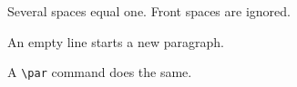 \documentclass{ctexart}
\begin{document}
Several spaces          equal one.
    Front spaces are ignored.
    
An empty line starts a new
paragraph.\par
A \verb|\par| command does
the same.
\end{document}
